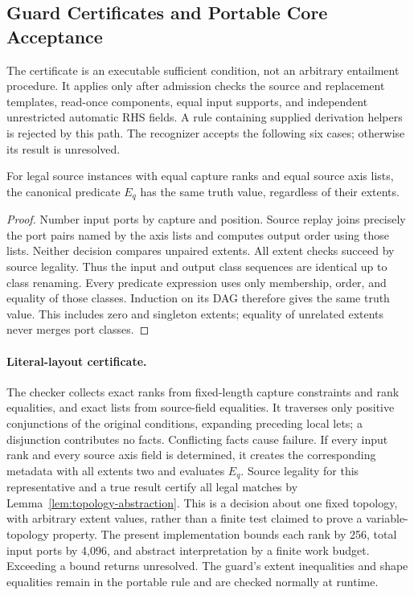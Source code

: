 \subsection{Guard Certificates and Portable Core Acceptance}
\label{app:accepted-core-proof}
The certificate is an executable sufficient condition, not an arbitrary
entailment procedure. It applies only after admission checks the source
and replacement templates, read-once components, equal input supports,
and independent unrestricted automatic RHS fields. A rule containing
supplied derivation helpers is rejected by this path. The recognizer
accepts the following six cases; otherwise its result is unresolved.

\begin{lemma}
\label{lem:topology-abstraction}
For legal source instances with equal capture ranks and equal source axis
lists, the canonical predicate $E_q$ has the same truth value, regardless
of their extents.
\end{lemma}
\begin{proof}
Number input ports by capture and position. Source replay joins precisely
the port pairs named by the axis lists and computes output order using
those lists. Neither decision compares unpaired extents. All extent checks
succeed by source legality. Thus the input and output class sequences are
identical up to class renaming. Every predicate expression uses only
membership, order, and equality of those classes. Induction on its DAG
therefore gives the same truth value. This includes zero and singleton
extents; equality of unrelated extents never merges port classes.
\end{proof}

\paragraph{Literal-layout certificate.}
The checker collects exact ranks from fixed-length capture constraints and
rank equalities, and exact lists from source-field equalities. It traverses
only positive conjunctions of the original conditions, expanding preceding
local lets; a disjunction contributes no facts. Conflicting facts cause
failure. If every input rank and every source axis field is determined,
it creates the corresponding metadata with all extents two and evaluates
$E_q$. Source legality for this representative and a true result certify
all legal matches by Lemma~\ref{lem:topology-abstraction}. This is a decision
about one fixed topology, with arbitrary extent values, rather than a
finite test claimed to prove a variable-topology property. The present
implementation bounds each rank by 256, total input ports by 4,096, and
abstract interpretation by a finite work budget. Exceeding a bound returns
unresolved. The guard's extent inequalities and shape equalities remain
in the portable rule and are checked normally at runtime.

